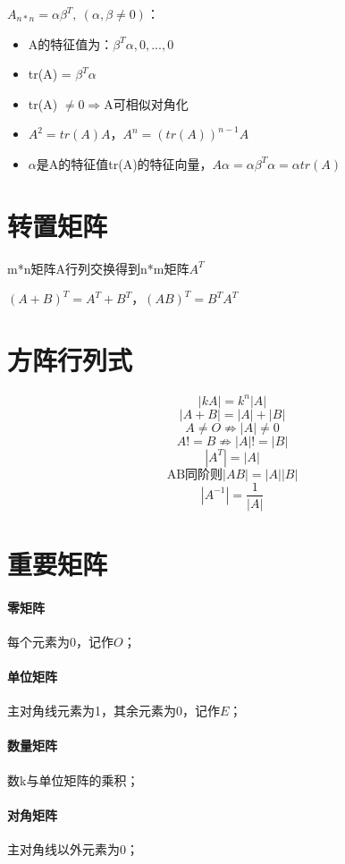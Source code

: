 \(A_{n * n} = \alpha\beta^T,\ (\alpha, \beta \neq 0)\)：\begin{itemize}
    \item A的特征值为：\(\beta^T\alpha, 0, ..., 0\)
    \item tr(A) = \(\beta^T\alpha\)
    \item tr(A) \(\neq 0 \Rightarrow\)A可相似对角化
    \item \(A^2 = tr(A)A\)，\(A^n = (tr(A))^{n - 1}A\)
    \item \(\alpha\)是A的特征值tr(A)的特征向量，\(A\alpha = \alpha\beta^T\alpha = \alpha tr(A)\)
\end{itemize}



\section{转置矩阵}

m*n矩阵A行列交换得到n*m矩阵\(A^T\)

\((A + B)^T = A^T + B^T\)，\((AB)^T = B^TA^T\)


\section{方阵行列式}

\[|kA| = k^n|A|\]
\[|A + B| = |A| + |B|\]
\[A \neq O \nRightarrow |A| \neq 0\]
\[A != B \nRightarrow |A| != |B|\]
\[|A^T| = |A|\]
\[\text{AB同阶则}|AB| = |A||B|\]
\[|A^{-1}| = \dfrac{1}{|A|}\]
\mymatrix

\section{重要矩阵}

\paragraph{零矩阵}
每个元素为0，记作\(O\)；


\paragraph{单位矩阵}
主对角线元素为1，其余元素为0，记作\(E\)；


\paragraph{数量矩阵}
数k与单位矩阵的乘积；


\paragraph{对角矩阵}
主对角线以外元素为0；


